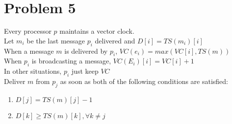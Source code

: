 \documentclass[12pt]{article}
\begin{document}
\section*{Problem 5}
Every processor $p$ maintains a vector clock.\\
Let $m_i$ be the last message $p_i$ delivered and $D[i]=TS(m_i)[i]$\\
When a message $m$ is delivered by $p_i$, $VC(e_i)=max(VC[i],TS(m))$\\
When $p_i$ is broadcasting a message, $VC(E_i)[i]=VC[i]+1$\\
In other situations, $p_i$ just keep $VC$\\
Deliver $m$ from $p_j$ as soon as both of the following conditions are satisfied:
\begin{enumerate}
\item
$D[j]=TS(m)[j]-1$
\item
$D[k]\geq TS(m)[k], \forall k\neq j$
\end{enumerate}
\end{document}
